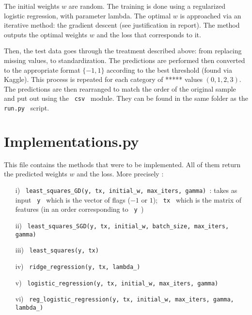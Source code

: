 \documentclass[11pt, oneside]{article}   	%
\begin{document}
The initial weights $w$ are random. The training is done using a regularized logistic regression, with parameter lambda. The optimal $w$ is approached via an iterative method: the gradient descent (see justification in report). The method outputs the optimal weights $w$ and the loss that corresponds to it.

Then, the test data goes through the treatment described above: from replacing missing values, to standardization. The predictions are performed then converted to the appropriate format $ \{ -1, 1 \}$ according to the best threshold (found via Kaggle). This process is repeated for each category of ***** values $(0,1,2,3)$. The predictions are then rearranged to match the order of the original sample and put out using the \lstinline" csv " module. They can be found in the same folder as the \lstinline" run.py " script.

\section{Implementations.py}

This file contains the methods that were to be implemented. All of them return the predicted weights $w$ and the loss. More precisely :
\begin{itemize}
\item[i)] \lstinline" least_squares_GD(y, tx, initial_w, max_iters, gamma) ": takes as input \lstinline" y " which is the vector of flags ($-1$ or $1$); \lstinline" tx " which is the matrix of features (in an order corresponding to \lstinline" y ") 
\item[ii)] \lstinline" least_squares_SGD(y, tx, initial_w, batch_size, max_iters, gamma) "
\item[iii)] \lstinline" least_squares(y, tx) "
\item[iv)] \lstinline" ridge_regression(y, tx, lambda_) "
\item[v)] \lstinline" logistic_regression(y, tx, initial_w, max_iters, gamma) "
\item[vi)] \lstinline" reg_logistic_regression(y, tx, initial_w, max_iters, gamma, lambda_) "
\end{itemize}
\end{document}
